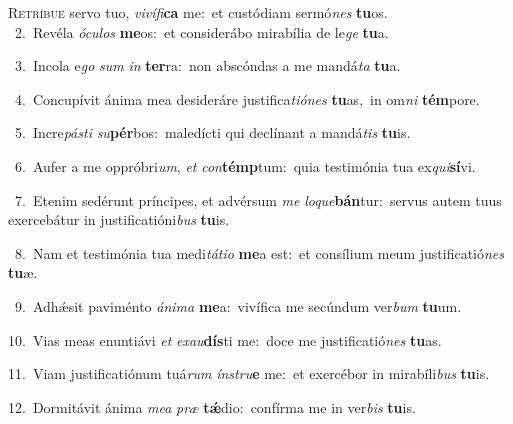 \lettrine{\initial\textcolor{\initialcolor}{R}}{etríbue} servo tuo, \textit{vi}\-\textit{ví}\textit{fi}\textbf{ca} me:~\star et custódiam sermó\textit{nes} \textbf{tu}\-os.\\
{\numbfont\textcolor{\numbcolor}{~2.}}~Revéla \textit{ó}\-\textit{cu}\textit{los} \textbf{me}\-os:~\star et considerábo mirabília de le\textit{ge} \textbf{tu}\-a.\par
{\numbfont\textcolor{\numbcolor}{~3.}}~Incola e\textit{go} \textit{sum} \textit{in} \textbf{ter}\-ra:~\star non abscóndas a me mandá\textit{ta} \textbf{tu}\-a.\par
{\numbfont\textcolor{\numbcolor}{~4.}}~Concupívit ánima mea desideráre justifica\-\textit{ti}\-\textit{ó}\textit{nes} \textbf{tu}\-as,~\star in om\textit{ni} \textbf{tém}\-pore.\par
{\numbfont\textcolor{\numbcolor}{~5.}}~Incre\-\textit{pás}\-\textit{ti} \textit{su}\-\textbf{pér}bos:~\star maledícti qui declínant a mandá\textit{tis} \textbf{tu}\-is.\par
{\numbfont\textcolor{\numbcolor}{~6.}}~Aufer a me oppróbri\-\textit{um}\-, \textit{et} \textit{con}\-\textbf{témp}tum:~\star quia testimónia tua ex\-\textit{qui}\-\textbf{sí}vi.\par
{\numbfont\textcolor{\numbcolor}{~7.}}~Etenim sedérunt príncipes, et advérsum \textit{me} \textit{lo}\-\textit{que}\textbf{bán}tur:~\star servus autem tuus exercebátur in justificatióni\textit{bus} \textbf{tu}\-is.\par
{\numbfont\textcolor{\numbcolor}{~8.}}~Nam et testimónia tua medi\-\textit{tá}\-\textit{ti}\textit{o} \textbf{me}\-a est:~\star et consílium meum justificatió\textit{nes} \textbf{tu}\-æ.\par
{\numbfont\textcolor{\numbcolor}{~9.}}~Adhǽsit paviménto \textit{á}\-\textit{ni}\textit{ma} \textbf{me}\-a:~\star vivífica me secúndum ver\textit{bum} \textbf{tu}\-um.\par
{\numbfont\textcolor{\numbcolor}{10.}}~Vias meas enuntiávi \textit{et} \textit{ex}\-\textit{au}\textbf{dís}ti me:~\star doce me justificatió\textit{nes} \textbf{tu}\-as.\par
{\numbfont\textcolor{\numbcolor}{11.}}~Viam justificatiónum tuá\textit{rum} \textit{ín}\-\textit{stru}\textbf{e} me:~\star et exercébor in mirabíli\textit{bus} \textbf{tu}\-is.\par
{\numbfont\textcolor{\numbcolor}{12.}}~Dormitávit ánima \textit{me}\-\textit{a} \textit{præ} \textbf{tǽ}\-dio:~\star confírma me in ver\textit{bis} \textbf{tu}\-is.\par

